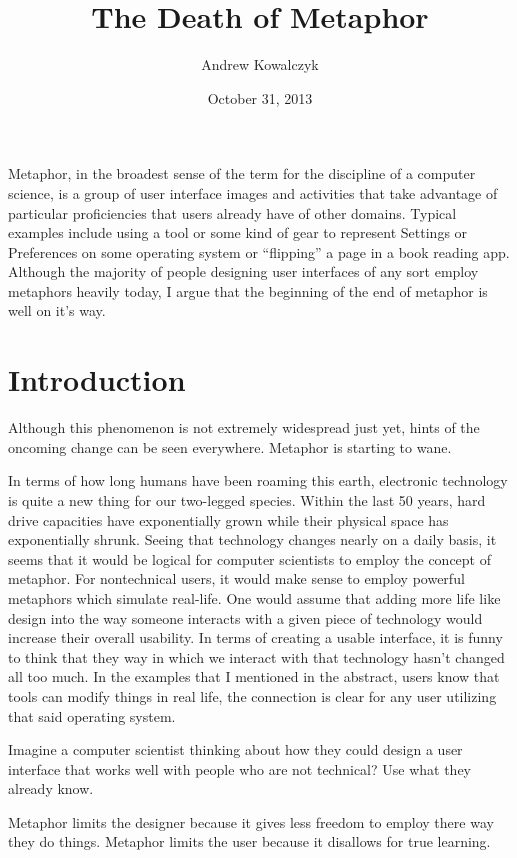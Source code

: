 \documentclass[11pt, oneside]{article}   	%
\title{The Death of Metaphor}
\author{Andrew Kowalczyk}
\date{October 31, 2013}							%
\begin{document}
\maketitle

Metaphor, in the broadest sense of the term for the discipline of a computer science, is a group of user interface images and activities that take advantage of particular proficiencies that users already have of other domains. Typical examples include using a tool or some kind of gear to represent Settings or Preferences on some operating system or ``flipping'' a page in a book reading app.  Although the majority of people designing user interfaces of any sort employ metaphors heavily today, I argue that the beginning of the end of metaphor is well on it's way.  

\section{Introduction}

Although this phenomenon is not extremely widespread just yet, hints of the oncoming change can be seen everywhere. Metaphor is starting to wane.

In terms of how long humans have been roaming this earth, electronic technology is quite a new thing for our two-legged species. Within the last 50 years, hard drive capacities have exponentially grown while their physical space has exponentially shrunk. Seeing that technology changes nearly on a daily basis, it seems that it would be logical for computer scientists to employ the concept of metaphor. For nontechnical users, it would make sense to employ powerful metaphors which simulate real-life. One would assume that adding more life like design into the way someone interacts with a given piece of technology would increase their overall usability. In terms of creating a usable interface, it is funny to think that they way in which we interact with that technology hasn't changed all too much. In the examples that I mentioned in the abstract, users know that tools can modify things in real life, the connection is clear for any user utilizing that said operating system.

Imagine a computer scientist thinking about how they could design a user interface that works well with people who are not technical? Use what they already know. 

Metaphor limits the designer because it gives less freedom to employ there way they do things. Metaphor limits the user because it disallows for true learning.
\cite{ars-technica-mavericks}
\end{document}
